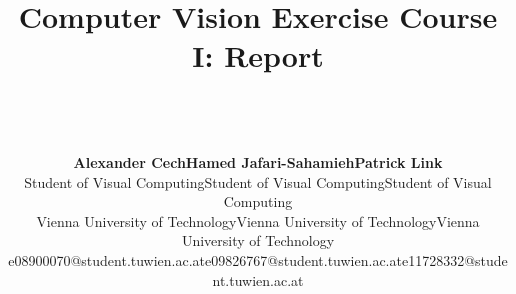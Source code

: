 \documentclass[a4paper,psfig,subfigure,epsfig,ausarbeitung,amssmb,float,caption,fontenc]{article}
\begin{document}
\date{}

\title{%
  \fontsize{14}{14pt} \bf Computer Vision Exercise Course I: Report}

\author{~\\
  ~\\
  \fontsize{12}{12pt}
  \begin{tabular}[t]{c c c}
  {\bf Alexander Cech}                    & {\bf Hamed Jafari-Sahamieh}             & {\bf Patrick Link}                      \\
  \small{Student of Visual Computing}     & \small{Student of Visual Computing}     & \small{Student of Visual Computing}     \\
  \small{Vienna University of Technology} & \small{Vienna University of Technology} & \small{Vienna University of Technology} \\
  \small{e08900070@student.tuwien.ac.at}  & \small{e09826767@student.tuwien.ac.at}  & \small{e11728332@student.tuwien.ac.at}  \\
  \end{tabular}
  ~\\ 
  \normalsize
  \normalsize
  }

\maketitle

\normalfont
\thispagestyle{empty}
\end{document}
